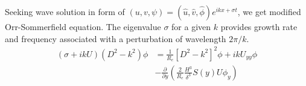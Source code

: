 \documentclass[aps,prl,twocolumn,showpacs,superscriptaddress,groupedaddress,10pt]{revtex4-1}  %
\newcommand{\grad}{\mathbf{\nabla}}
\newcommand{\del}{\partial}
\begin{document}
Seeking wave solution in form of $\left(u,v,\psi \right)= \left(\hat u, \hat v, \hat\phi \right)e^{ikx+\sigma t}$,  we get modified Orr-Sommerfield equation. The eigenvalue $\sigma$ for a given $k$ provides growth rate and frequency associated with a perturbation of wavelength $2\pi/k$.
\begin{equation}
\begin{split}
\left(\sigma+ikU\right) \left(D^2-k^2\right)\phi &= \frac{1}{R_{e}}\left[D^2 -k^{2} \right]^2\phi +ikU_{yy}\phi \\
&-\frac{\del}{\del y}\left(\frac{2}{R_e}\frac{H^3}{\delta^3}S(y) U\phi_y\right)
\label{Orr-somerfield}
\end{split}
\end{equation}
\end{document}
